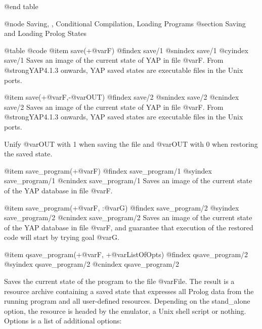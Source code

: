 {{{{@end table

@node Saving, , Conditional Compilation, Loading Programs
@section Saving and Loading Prolog States

@table @code
@item save(+@var{F})
@findex save/1
@snindex save/1
@cyindex save/1
Saves an image of the current state of YAP in file @var{F}. From
@strong{YAP4.1.3} onwards, YAP saved states are executable
files in the Unix ports.

@item save(+@var{F},-@var{OUT})
@findex save/2
@snindex save/2
@cnindex save/2
Saves an image of the current state of YAP in file @var{F}. From
@strong{YAP4.1.3} onwards, YAP saved states are executable
files in the Unix ports.

Unify @var{OUT} with 1 when saving the file and @var{OUT} with 0 when
restoring the saved state.

@item save_program(+@var{F})
@findex save_program/1
@syindex save_program/1
@cnindex save_program/1
Saves an image of the current state of the YAP database in file
@var{F}.

@item save_program(+@var{F}, :@var{G})
@findex save_program/2
@syindex save_program/2
@cnindex save_program/2
Saves an image of the current state of the YAP database in file
@var{F}, and guarantee that execution of the restored code will start by
trying goal @var{G}.

@item qsave_program(+@var{F}, +@var{ListOfOpts})
@findex qsave_program/2
@syindex qsave_program/2
@cnindex qsave_program/2

Saves the current state of the program to the file @var{File}. The
result is a resource archive containing a saved state that expresses
all Prolog data from the running program and all user-defined
resources. Depending on the stand_alone option, the resource is headed
by the emulator, a Unix shell script or nothing. Options is a list of
additional options:

}}}}
